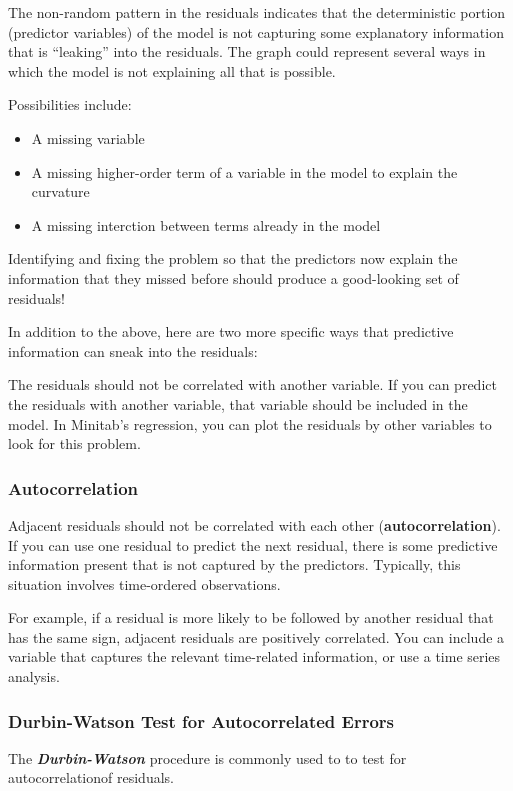 \documentclass[12pt, a4paper]{article}
\theoremstyle{plain}
\theoremstyle{definition}
\theoremstyle{remark}
\begin{document}
The non-random pattern in the residuals indicates that the deterministic portion (predictor variables) of the model is not capturing some explanatory information that is “leaking” into the residuals. The graph could represent several ways in which the model is not explaining all that is possible. 

Possibilities include:

\begin{itemize}
\item A missing variable
\item A missing higher-order term of a variable in the model to explain the curvature
\item A missing interction between terms already in the model
\end{itemize}


Identifying and fixing the problem so that the predictors now explain the information that they missed before should produce a good-looking set of residuals!

In addition to the above, here are two more specific ways that predictive information can sneak into the residuals:

The residuals should not be correlated with another variable. If you can predict the residuals with another variable, that variable should be included in the model. In Minitab’s regression, you can plot the residuals by other variables to look for this problem.


\subsubsection{Autocorrelation} 
Adjacent residuals should not be correlated with each other (\textbf{autocorrelation}). If you can use one residual to predict the next residual, there is some predictive information present that is not captured by the predictors. Typically, this situation involves time-ordered observations. 

For example, if a residual is more likely to be followed by another residual that has the same sign, adjacent residuals are positively correlated. You can include a variable that captures the relevant time-related information, or use a time series analysis. 

\subsubsection{Durbin-Watson Test for Autocorrelated Errors}
The \textbf{\textit{Durbin-Watson} }procedure is commonly used to to test for autocorrelationof residuals.
\end{document}
